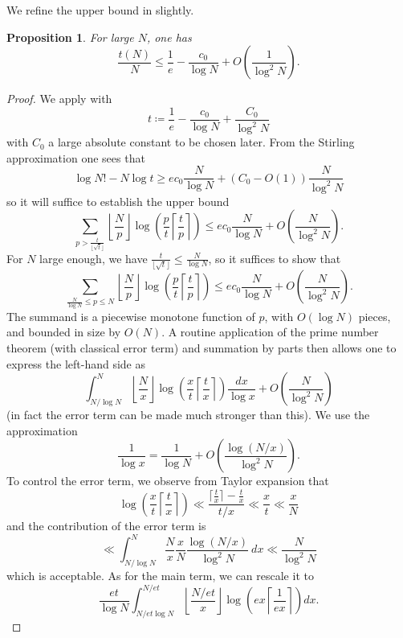 \documentclass[12pt,a4paper,reqno]{amsart}
\numberwithin{equation}{section}
\theoremstyle{plain}
\newtheorem{proposition}[theorem]{Proposition}
\theoremstyle{definition}
\begin{document}
We refine the upper bound in \cite{tao} slightly.

\begin{proposition}\label{upper-bound}  For large $N$, one has
$$ \frac{t(N)}{N} \leq \frac{1}{e} - \frac{c_0}{\log N} + O\left( \frac{1}{\log^2 N} \right).$$
\end{proposition}

\begin{proof}  We apply  with
  $$ t \coloneqq \frac{1}{e} - \frac{c_0}{\log N} + \frac{C_0}{\log^2 N}$$
with $C_0$ a large absolute constant to be chosen later.  From the Stirling approximation one sees that
$$ \log N! - N \log t \geq ec_0 \frac{N}{\log N} + (C_0-O(1)) \frac{N}{\log^2 N}$$
so it will suffice to establish the upper bound
$$ \sum_{p > \frac{t}{\lfloor\sqrt{t}\rfloor}} \left\lfloor \frac{N}{p} \right\rfloor \log \left( \frac{p}{t} \left\lceil \frac{t}{p} \right\rceil \right) \leq ec_0 \frac{N}{\log N} + O\left( \frac{N}{\log^2 N} \right).$$
For $N$ large enough, we have $\frac{t}{\lfloor\sqrt{t}\rfloor} \leq \frac{N}{\log N}$, so it suffices to show that
$$ \sum_{\frac{N}{\log N} \leq p \leq N} \left\lfloor \frac{N}{p} \right\rfloor \log \left( \frac{p}{t} \left\lceil \frac{t}{p} \right\rceil \right) \leq ec_0 \frac{N}{\log N} + O\left( \frac{N}{\log^2 N} \right).$$
The summand is a piecewise monotone function of $p$, with $O(\log N)$ pieces, and bounded in size by $O(N)$.  A routine application of the prime number theorem (with classical error term) and summation by parts then allows one to express the left-hand side as
$$ \int_{N/\log N}^N \left\lfloor \frac{N}{x} \right\rfloor \log \left( \frac{x}{t} \left\lceil \frac{t}{x} \right\rceil \right) \frac{dx}{\log x} + O\left( \frac{N}{\log^2 N} \right)$$
(in fact the error term can be made much stronger than this). We use the approximation 
$$\frac{1}{\log x} = \frac{1}{\log N} + O\left( \frac{\log (N/x)}{\log^2 N} \right).$$ 
To control the error term, we observe from Taylor expansion that
\begin{equation}\label{tax} 
\log \left( \frac{x}{t} \left\lceil \frac{t}{x} \right\rceil \right)
\ll \frac{\lceil \frac{t}{x} \rceil - \frac{t}{x}}{t/x} \ll \frac{x}{t} \ll \frac{x}{N}
\end{equation}
and the contribution of the error term is
$$ \ll \int_{N/\log N}^N \frac{N}{x} \frac{x}{N} \frac{\log (N/x)}{\log^2 N}\ dx \ll \frac{N}{\log^2 N}$$
which is acceptable.  As for the main term, we can rescale it to
$$ \frac{et}{\log N} \int_{N/et\log N}^{N/et} \left\lfloor \frac{N/et}{x} \right\rfloor \log \left( ex \left\lceil \frac{1}{ex} \right\rceil \right) dx.$$

\end{proof}
\end{document}
